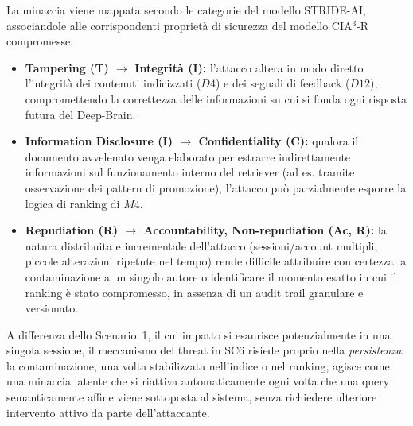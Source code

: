 \documentclass[11pt,a4paper]{article}
\begin{document}
La minaccia viene mappata secondo le categorie del modello STRIDE-AI, associandole alle
corrispondenti proprietà di sicurezza del modello CIA$^3$-R compromesse:

\begin{itemize}
    \item \textbf{Tampering (T) $\to$ Integrità (I):} l'attacco altera in modo diretto l'integrità
    dei contenuti indicizzati ($D4$) e dei segnali di feedback ($D12$), compromettendo la correttezza
    delle informazioni su cui si fonda ogni risposta futura del Deep-Brain.
    \item \textbf{Information Disclosure (I) $\to$ Confidentiality (C):} qualora il documento
    avvelenato venga elaborato per estrarre indirettamente informazioni sul funzionamento interno del
    retriever (ad es. tramite osservazione dei pattern di promozione), l'attacco può parzialmente
    esporre la logica di ranking di $M4$.
    \item \textbf{Repudiation (R) $\to$ Accountability, Non-repudiation (Ac, R):} la natura
    distribuita e incrementale dell'attacco (sessioni/account multipli, piccole alterazioni ripetute
    nel tempo) rende difficile attribuire con certezza la contaminazione a un singolo autore o
    identificare il momento esatto in cui il ranking è stato compromesso, in assenza di un audit
    trail granulare e versionato.
\end{itemize}

A differenza dello Scenario~1, il cui impatto si esaurisce potenzialmente in una singola sessione,
il meccanismo del threat in SC6 risiede proprio nella \emph{persistenza}: la contaminazione,
una volta stabilizzata nell'indice o nel ranking, agisce come una minaccia latente che si riattiva
automaticamente ogni volta che una query semanticamente affine viene sottoposta al sistema, senza
richiedere ulteriore intervento attivo da parte dell'attaccante. 

\end{document}
